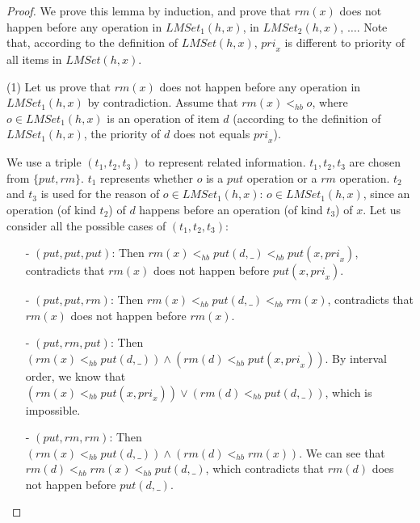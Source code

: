 \begin {proof}

We prove this lemma by induction, and prove that $\textit{rm}(x)$ does not happen before any operation in $\textit{LMSet}_1(h,x)$, in $\textit{LMSet}_2(h,x)$, $\ldots$. Note that, according to the definition of $\textit{LMSet}(h,x)$, $\textit{pri}_x$ is different to priority of all items in $\textit{LMSet}(h,x)$.

\noindent (1) Let us prove that $\textit{rm}(x)$ does not happen before any operation in $\textit{LMSet}_1(h,x)$ by contradiction. Assume that $\textit{rm}(x) <_{hb} o$, where $o \in \textit{LMSet}_1(h,x)$ is an operation of item $d$ (according to the definition of $\textit{LMSet}_1(h,x)$, the priority of $d$ does not equals $\textit{pri}_x$).

We use a triple $(t_1,t_2,t_3)$ to represent related information. $t_1,t_2,t_3$ are chosen from $\{ \textit{put},\textit{rm} \}$. $t_1$ represents whether $o$ is a $\textit{put}$ operation or a $\textit{rm}$ operation. $t_2$ and $t_3$ is used for the reason of $o \in \textit{LMSet}_1(h,x)$: $o \in \textit{LMSet}_1(h,x)$, since an operation (of kind $t_2$) of $d$ happens before an operation (of kind $t_3$) of $x$. Let us consider all the possible cases of $(t_1,t_2,t_3)$:

\begin{itemize}
\setlength{\itemsep}{0.5pt}
\item[-] $(\textit{put},\textit{put},\textit{put})$: Then $\textit{rm}(x) <_{hb} \textit{put}(d,\_) <_{hb} \textit{put}(x,\textit{pri}_x)$, contradicts that $\textit{rm}(x)$ does not happen before $\textit{put}(x,\textit{pri}_x)$.

\item[-] $(\textit{put},\textit{put},\textit{rm})$: Then $\textit{rm}(x) <_{hb} \textit{put}(d,\_) <_{hb} \textit{rm}(x)$, contradicts that $\textit{rm}(x)$ does not happen before $\textit{rm}(x)$.

\item[-] $(\textit{put},\textit{rm},\textit{put})$: Then $( \textit{rm}(x) <_{hb} \textit{put}(d,\_) ) \wedge ( \textit{rm}(d) <_{hb} \textit{put}(x,\textit{pri}_x) )$. By interval order, we know that $( \textit{rm}(x) <_{hb} \textit{put}(x,\textit{pri}_x) ) \vee ( \textit{rm}(d) <_{hb} \textit{put}(d,\_) )$, which is impossible.

\item[-] $(\textit{put},\textit{rm},\textit{rm})$: Then $( \textit{rm}(x) <_{hb} \textit{put}(d,\_) ) \wedge ( \textit{rm}(d) <_{hb} \textit{rm}(x) )$. We can see that $\textit{rm}(d) <_{hb} \textit{rm}(x) <_{hb} \textit{put}(d,\_)$, which contradicts that $\textit{rm}(d)$ does not happen before $\textit{put}(d,\_)$.


\end{itemize}
\end{proof}
